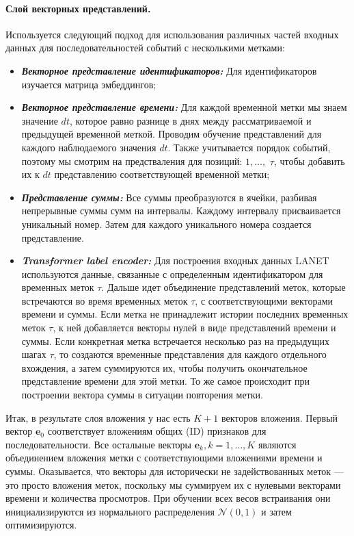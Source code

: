 \documentclass[a4paper, 12pt]{article} %
\newcommand{\vecE}{\mathbf{e}}
\begin{document}
\paragraph{\textbf{Слой векторных представлений.}} Используется следующий подход для использования различных частей входных данных для последовательностей событий с несколькими метками:
\begin{itemize}
    \item \textbf{\emph{Векторное представление идентификаторов:}} Для идентификаторов изучается матрица эмбеддингов;
    \item \textbf{\emph{Векторное представление времени:}} Для каждой временной метки мы знаем значение $dt$, которое равно разнице в днях между рассматриваемой и предыдущей временной меткой. Проводим обучение представлений для каждого наблюдаемого значения $dt$. Также учитывается порядок событий, поэтому мы смотрим на предстваления для позиций: $1, \dots,$ \textit{$\tau$}, чтобы добавить их к $dt$ представлению соответствующей временной метки; 
    \item \textbf{\emph{Представление суммы:}} Все суммы преобразуются в ячейки, разбивая непрерывные суммы сумм на интервалы. Каждому интервалу присваивается уникальный номер. Затем для каждого уникального номера создается представление.
    \item \textbf{\emph{Transformer label encoder:}} Для построения входных данных LANET используются данные, связанные с определенным идентификатором для временных меток \textit{$\tau$}. Дальше идет объединение представлений меток, которые встречаются во время временных меток \textit{$\tau$}, с соответствующими векторами времени и суммы. Если метка не принадлежит истории последних временных меток \textit{$\tau$}, к ней добавляется векторы нулей в виде представлений времени и суммы. Если конкретная метка встречается несколько раз на предыдущих шагах \textit{$\tau$}, то создаются временные представления для каждого отдельного вхождения, а затем суммируются их, чтобы получить окончательное представление времени для этой метки. То же самое происходит при построении вектора суммы в ситуации повторения метки.
\end{itemize}

Итак, в результате слоя вложения у нас есть $K + 1$ векторов вложения. 
Первый вектор $\vecE_0$ соответствует вложениям общих (ID) признаков для последовательности.
Все остальные векторы $\vecE_k, k = 1, \dots, K$ являются объединением вложения метки с соответствующими вложениями времени и суммы. Оказывается, что векторы для исторически не задействованных меток --- это просто вложения меток, поскольку мы суммируем их с нулевыми векторами времени и количества просмотров.
При обучении всех весов встраивания они инициализируются из нормального распределения $\mathcal{N}(0, 1)$ и затем оптимизируются.
\end{document}

